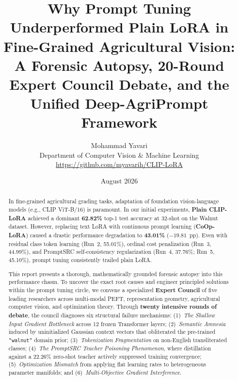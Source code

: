 \documentclass[letterpaper,11pt,leqno]{article}
\begin{document}
\title{\textbf{Why Prompt Tuning Underperformed Plain LoRA in Fine-Grained Agricultural Vision:}\\[0.3em]
\large A Forensic Autopsy, 20-Round Expert Council Debate, and the Unified Deep-AgriPrompt Framework}
\author{Mohammad Yavari \\
\small Department of Computer Vision \& Machine Learning \\
\small \url{https://github.com/myavarih/CLIP-LoRA}}
\date{August 2026}

\begin{titlepage}
\maketitle
\begin{abstract}
In fine-grained agricultural grading tasks, adaptation of foundation vision-language models (e.g., CLIP ViT-B/16) is paramount. In our initial experiments, \textbf{Plain CLIP-LoRA} achieved a dominant \textbf{62.82\%} top-1 test accuracy at 32-shot on the Walnut dataset. However, replacing text LoRA with continuous prompt learning (\textbf{CoOp-LoRA}) caused a drastic performance degradation to \textbf{43.01\%} ($-19.81$~pp). Even with residual class token learning (Run~2, 55.01\%), ordinal cost penalization (Run~3, 44.99\%), and PromptSRC self-consistency regularization (Run~4, 37.76\%; Run~5, 45.10\%), prompt tuning consistently trailed plain LoRA.

This report presents a thorough, mathematically grounded forensic autopsy into this performance chasm. To uncover the exact root causes and engineer principled solutions within the prompt tuning circle, we convene a specialized \textbf{Expert Council} of five leading researchers across multi-modal PEFT, representation geometry, agricultural computer vision, and optimization theory. Through \textbf{twenty intensive rounds of debate}, the council diagnoses six structural failure mechanisms: (1)~\textit{The Shallow Input Gradient Bottleneck} across 12 frozen Transformer layers; (2)~\textit{Semantic Amnesia} induced by uninitialized Gaussian context vectors that obliterated the pre-trained \texttt{"walnut"} domain prior; (3)~\textit{Tokenization Fragmentation} on non-English transliterated classes; (4)~\textit{The PromptSRC Teacher Poisoning Phenomenon}, where distillation against a 22.26\% zero-shot teacher actively suppressed training convergence; (5)~\textit{Optimization Mismatch} from applying flat learning rates to heterogeneous parameter manifolds; and (6)~\textit{Multi-Objective Gradient Interference}.


\end{abstract}
\end{titlepage}
\end{document}
